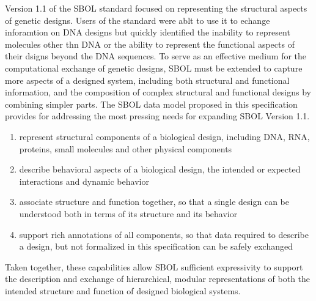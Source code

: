 

Version 1.1 of the SBOL standard focused on representing the structural aspects of genetic designs. Users of the standard were ablt to use it to echange inforamtion on DNA designs but quickly identified the inability to represent molecules other thn DNA or the ability to represent the functional aspects of their dsigns beyond the DNA sequences. To serve as an effective medium for the computational exchange of genetic designs, SBOL must be extended to capture more aspects of a designed system, including both structural and functional information, and the composition of complex structural and functional designs by combining simpler parts. The SBOL data model proposed in this specification provides for addressing the most pressing needs for expanding SBOL Version 1.1. 

\begin{enumerate}

\item represent structural components of a biological design, including DNA, RNA, proteins, small molecules and other physical components

\item describe behavioral aspects of a biological design, the intended or expected interactions and dynamic behavior

\item associate structure and function together, so that a single design can be understood both in terms of its structure and its behavior

\item support rich annotations of all components, so that data required to describe a design, but not formalized in this specification can be safely exchanged

\end{enumerate}

Taken together, these capabilities allow SBOL sufficient expressivity to support the description and exchange of hierarchical, modular representations of both the intended structure and function of designed biological systems.

